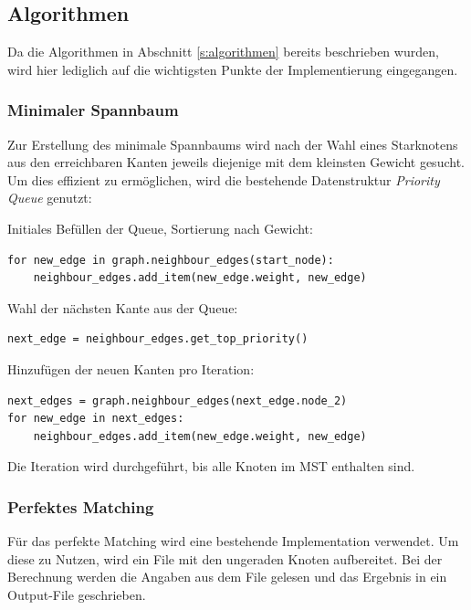 \documentclass[11pt,a4paper]{article}
\begin{document}
\subsection{Algorithmen}
Da die Algorithmen in Abschnitt \ref{s:algorithmen} bereits beschrieben wurden, wird hier lediglich auf die wichtigsten Punkte der Implementierung eingegangen.

\subsubsection{Minimaler Spannbaum}
Zur Erstellung des minimale Spannbaums wird nach der Wahl eines Starknotens aus den erreichbaren Kanten jeweils diejenige mit dem kleinsten Gewicht gesucht. Um dies effizient zu ermöglichen, wird die bestehende Datenstruktur \emph{Priority Queue} genutzt:

\begin{flushleft}
    Initiales Befüllen der Queue, Sortierung nach Gewicht:
\end{flushleft}
\begin{verbatim}
for new_edge in graph.neighbour_edges(start_node):
    neighbour_edges.add_item(new_edge.weight, new_edge)
\end{verbatim}

\begin{flushleft}
    Wahl der nächsten Kante aus der Queue:
\end{flushleft}
\begin{verbatim}
next_edge = neighbour_edges.get_top_priority()
\end{verbatim}

\begin{flushleft}
    Hinzufügen der neuen Kanten pro Iteration:
\end{flushleft}

\begin{verbatim}
next_edges = graph.neighbour_edges(next_edge.node_2)
for new_edge in next_edges:
    neighbour_edges.add_item(new_edge.weight, new_edge)
\end{verbatim}

Die Iteration wird durchgeführt, bis alle Knoten im MST enthalten sind.

\subsubsection{Perfektes Matching}
Für das perfekte Matching wird eine bestehende Implementation verwendet. Um diese zu Nutzen, wird ein File mit den ungeraden Knoten aufbereitet. Bei der Berechnung werden die Angaben aus dem File gelesen und das Ergebnis in ein Output-File geschrieben.
\end{document}
